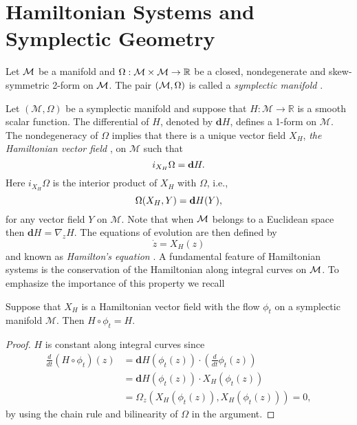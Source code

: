 \section{Hamiltonian Systems and Symplectic Geometry} \label{chap:Hasy:1}
Let $\color{black} \mathcal M$ be a manifold and $\color{black} \Omega:\mathcal M \times \mathcal M \to \mathbb R$ be a closed, nondegenerate {\edit and skew-symmetric} 2-form on $\color{black} \mathcal M$. The pair $\color{black} (\mathcal M,\Omega)$ is called a \emph{symplectic manifold} {\edit \cite{Marsden:1999ck}}. 


{\edit Let $(\mathcal M,\Omega)$ be a symplectic manifold and suppose that $H:\mathcal M \to \mathbb R$ is a smooth scalar function. The differential of $H$, denoted by $\mathbf dH$, defines a 1-form on $\mathcal M$. {\blue The nondegeneracy of $\Omega$ implies that there is a unique vector field $X_H$, \emph{the Hamiltonian vector field }\cite{da2003introduction,Marsden:1999ck}, on $\mathcal M$ such that}
\begin{equation} \label{eq:Hasy:1}
	\edit i_{X_H} \Omega = \mathbf dH. 
\end{equation}
}
{\blue Here $i_{X_H} \Omega$ is the interior product of $X_H$ with $\Omega$, i.e.,}
\begin{equation}
	\color{black} \Omega(X_H,Y) = \mathbf dH(Y),
\end{equation}
{\edit for any vector field $Y$ on $\mathcal M$.} Note that when $\color{black} \mathcal M$ belongs to a Euclidean space then $\mathbf d H = \nabla_z H$. The equations of evolution are then defined by
\begin{equation} \label{eq:Hasy:2}
	\dot z = X_H(z)
\end{equation}
and known as \emph{Hamilton's equation} \cite{Marsden:1999ck}. A fundamental feature of Hamiltonian systems is the conservation of the Hamiltonian along integral curves on $\color{black} \mathcal M$. To emphasize the importance of this property we recall {\edit \cite{Marsden:1999ck}}

\begin{theorem} \label{theorem:Hasy:1}
Suppose that $X_H$ is a Hamiltonian vector field with the flow $\phi_t$ on a symplectic manifold $\mathcal M$. Then $H\circ \phi_t = H$.
\end{theorem}

\begin{proof}
$H$ is constant along integral curves since
\begin{equation} \label{eq:Hasy:3}
\begin{aligned}
	\frac{d}{dt}(H\circ \phi_t)(z) &= \mathbf d H(\phi_t(z)) \cdot( \frac{d}{dt} \phi_t(z) ) \\
	&= \mathbf d H (\phi_t(z))\cdot X_H(\phi_t(z)) \\
	&= \Omega_z( X_H(\phi_t(z)), X_H(\phi_t(z)) ) = 0,
\end{aligned}
\end{equation}
{\edit by using} the chain rule and bilinearity of $\Omega$ in the argument.
\end{proof}

